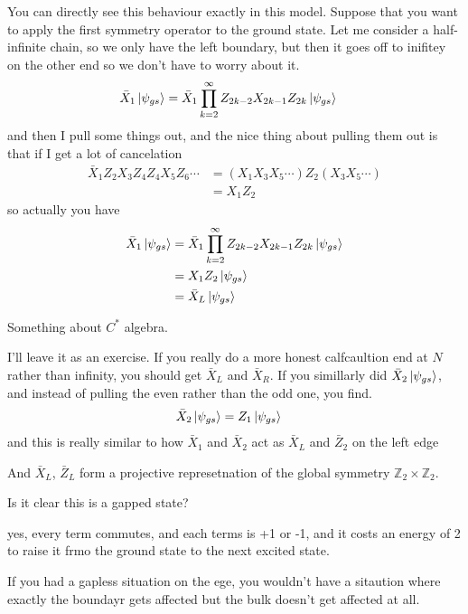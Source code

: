 You can directly see this behaviour exactly in this model.
Suppose that you want to apply the first symmetry operator to the ground state.
Let me consider a half-infinite chain,
so we only have the left boundary,
but then it goes off to inifitey on the other end so we don't have to worry
about it.
\begin{align}
    \bar{X}_1\ket{\psi_{gs}} &=
    \bar{X}_1 \prod_{k=2}^{\infty} Z_{2k - 2} X_{2k -  1} Z_{2k}
    \ket{\psi_{gs}}
\end{align}
and then I pull some things out,
and the nice thing about pulling them out is that if I get a lot of cancelation
\begin{align}
    \bar{X}_1 Z_2 X_3 Z_4 Z_4 X_5 Z_6\cdots &=
    (X_1 X_3 X_5\cdots) Z_2 (X_3 X_5 \cdots)\\
    &= X_1 Z_2
\end{align}
so actually you have
\begin{align}
    \bar{X}_1\ket{\psi_{gs}} &=
    \bar{X}_1 \prod_{k=2}^{\infty} Z_{2k - 2} X_{2k -  1} Z_{2k}
    \ket{\psi_{gs}}\\
    &=
    X_1 Z_2 \ket{\psi_{gs}}\\
    &=
    \bar{X}_L \ket{\psi_{gs}}
\end{align}

\begin{question}
    Something about $C^*$ algebra.
\end{question}
I'll leave it as an exercise.
If you really do a more honest calfcaultion end at $N$ rather than infinity,
you should get $\bar{X}_L$ and $\bar{X}_R$.
If you simillarly did 
$\bar{X}_2\ket{\psi_{gs}}$,
and instead of pulling the even rather than the odd one,
you find.
\begin{align}
    \bar{X}_2\ket{\psi_{gs}} &=
    Z_1 \ket{\psi_{gs}}
\end{align}
and this is really similar to how
$\bar{X}_1$ and $\bar{X}_2$ act as
$\bar{X}_L$ and $\bar{Z}_2$
on the left edge

And $\bar{X}_L$, $\bar{Z}_L$ form a projective represetnation of
the global symmetry
$\mathbb{Z}_2\times \mathbb{Z}_2$.

\begin{question}
    Is it clear this is a gapped state?
\end{question}
yes, every term commutes,
and each terms is +1 or -1,
and it costs an energy of 2 to raise it frmo the ground state to the next
excited state.

If you had a gapless situation on the ege,
you wouldn't have a sitaution where exactly the boundayr gets affected but the
bulk doesn't get affected at all.

